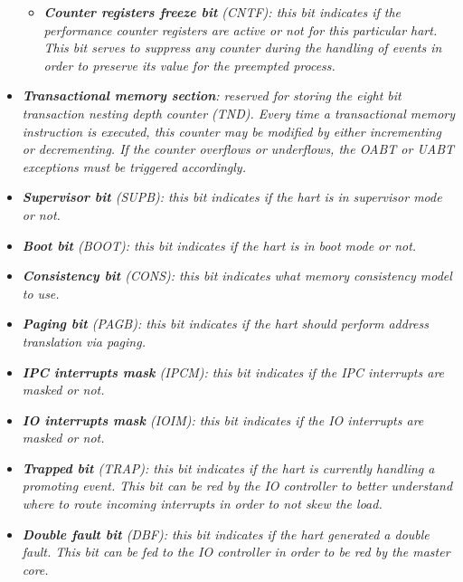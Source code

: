 \begin{itemize}
\begin{itemize}
                        \item \textit{\textbf{Counter registers freeze bit} (CNTF): this bit indicates if the performance counter registers are active or not for this particular hart. This bit serves to suppress any counter during the handling of events in order to preserve its value for the preempted process.}

                    \end{itemize}

                \item \textit{\textbf{Transactional memory section}: reserved for storing the eight bit transaction nesting depth counter (TND). Every time a transactional memory instruction is executed, this counter may be modified by either incrementing or decrementing. If the counter overflows or underflows, the OABT or UABT exceptions must be triggered accordingly.}

                \item \textit{\textbf{Supervisor bit} (SUPB): this bit indicates if the hart is in supervisor mode or not.}

                \item \textit{\textbf{Boot bit} (BOOT): this bit indicates if the hart is in boot mode or not.}

                \item \textit{\textbf{Consistency bit} (CONS): this bit indicates what memory consistency model to use.}

                \item \textit{\textbf{Paging bit} (PAGB): this bit indicates if the hart should perform address translation via paging.}

                \item \textit{\textbf{IPC interrupts mask} (IPCM): this bit indicates if the IPC interrupts are masked or not.}

                \item \textit{\textbf{IO interrupts mask} (IOIM): this bit indicates if the IO interrupts are masked or not.}

                \item \textit{\textbf{Trapped bit} (TRAP): this bit indicates if the hart is currently handling a promoting event. This bit can be red by the IO controller to better understand where to route incoming interrupts in order to not skew the load.}

                \item \textit{\textbf{Double fault bit} (DBF): this bit indicates if the hart generated a double fault. This bit can be fed to the IO controller in order to be red by the master core.}


\end{itemize}

